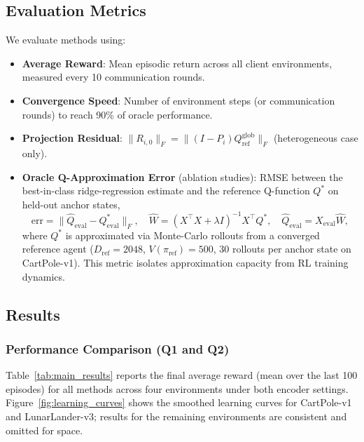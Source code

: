 \subsection{Evaluation Metrics}
\label{subsec:metrics}

We evaluate methods using:
\begin{itemize}
    \item \textbf{Average Reward}: Mean episodic return across all client environments, measured every 10 communication rounds.
    \item \textbf{Convergence Speed}: Number of environment steps (or communication rounds) to reach 90\% of oracle performance.
    \item \textbf{Projection Residual}: $\|R_{i,0}\|_F = \|(I - P_i)Q^{\mathrm{glob}}_{\mathrm{ref}}\|_F$ (heterogeneous case only).
    \item \textbf{Oracle Q-Approximation Error} (ablation studies): RMSE between the best-in-class ridge-regression estimate and the reference Q-function $Q^*$ on held-out anchor states,
    \begin{equation}
      \label{eq:metric_qaerr}
      \mathrm{err} = \bigl\|\hat{Q}_{\mathrm{eval}} - Q^*_{\mathrm{eval}}\bigr\|_F,
      \quad
      \hat{W} = (X^\top X + \lambda I)^{-1}X^\top Q^*,\quad
      \hat{Q}_{\mathrm{eval}} = X_{\mathrm{eval}}\hat{W},
    \end{equation}
    where $Q^*$ is approximated via Monte-Carlo rollouts from a converged reference agent ($D_{\mathrm{ref}}=2048$, $V(\pi_{\mathrm{ref}})=500$, 30 rollouts per anchor state on CartPole-v1). This metric isolates approximation capacity from RL training dynamics.
\end{itemize}

\subsection{Results}
\label{sec:results}

\subsubsection{Performance Comparison (Q1 and Q2)}
\label{subsec:performance_homo}

Table~\ref{tab:main_results} reports the final average reward (mean over the last 100 episodes) for all methods across four environments under both encoder settings.
Figure~\ref{fig:learning_curves} shows the smoothed learning curves for CartPole-v1 and LunarLander-v3; results for the remaining environments are consistent and omitted for space.


